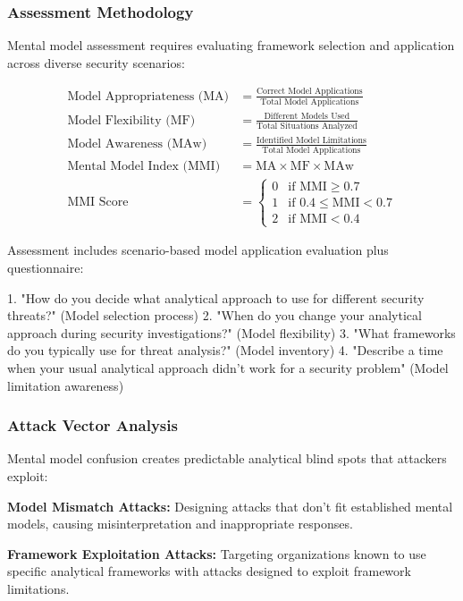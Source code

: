 \documentclass[11pt,a4paper]{article}
\begin{document}
\subsubsection{Assessment Methodology}

Mental model assessment requires evaluating framework selection and application across diverse security scenarios:

\begin{align}
\text{Model Appropriateness (MA)} &= \frac{\text{Correct Model Applications}}{\text{Total Model Applications}} \\
\text{Model Flexibility (MF)} &= \frac{\text{Different Models Used}}{\text{Total Situations Analyzed}} \\
\text{Model Awareness (MAw)} &= \frac{\text{Identified Model Limitations}}{\text{Total Model Applications}} \\
\text{Mental Model Index (MMI)} &= \text{MA} \times \text{MF} \times \text{MAw} \\
\text{MMI Score} &= \begin{cases}
0 & \text{if MMI} \geq 0.7 \\
1 & \text{if } 0.4 \leq \text{MMI} < 0.7 \\
2 & \text{if MMI} < 0.4
\end{cases}
\end{align}

Assessment includes scenario-based model application evaluation plus questionnaire:

1. "How do you decide what analytical approach to use for different security threats?" (Model selection process)
2. "When do you change your analytical approach during security investigations?" (Model flexibility)
3. "What frameworks do you typically use for threat analysis?" (Model inventory)
4. "Describe a time when your usual analytical approach didn't work for a security problem" (Model limitation awareness)

\subsubsection{Attack Vector Analysis}

Mental model confusion creates predictable analytical blind spots that attackers exploit:

\textbf{Model Mismatch Attacks:} Designing attacks that don't fit established mental models, causing misinterpretation and inappropriate responses.

\textbf{Framework Exploitation Attacks:} Targeting organizations known to use specific analytical frameworks with attacks designed to exploit framework limitations.
\end{document}
